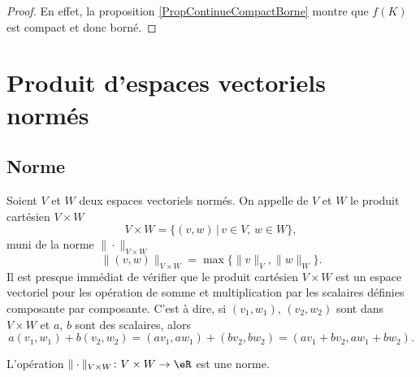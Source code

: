 \begin{proof}
	En effet, la proposition \ref{PropContinueCompactBorne} montre que $f(K)$ est compact et donc borné.
\end{proof}


\section{Produit d'espaces vectoriels normés}\label{sec_prod}

\subsection{Norme}

Soient $V$ et $W$ deux espaces vectoriels normés. On appelle  de $V$ et $W$ le produit cartésien $V\times W$ 
\begin{equation}
V\times W=\{(v,w)\,|\, v\in V,\, w\in W\},
\end{equation}
muni de la norme $\|\cdot \|_{V\times W}$
\begin{equation}	\label{EqNormeVxWmax}
	\|(v,w) \|_{V\times W}=\max\{\|v\|_{V},\|w\|_W\}.
\end{equation}
Il est presque immédiat de vérifier que le produit cartésien $V\times W$ est un espace vectoriel pour les opération de somme et multiplication par les scalaires définies composante par composante. C'est à dire,  si $(v_1,w_1)$, $(v_2,w_2)$ sont dans $V\times W$ et $a$, $b$ sont des scalaires, alors  
\begin{equation}
 a (v_1,w_1)+ b(v_2,w_2)=(av_1,aw_1)+ (bv_2,bw_2)=(av_1+bv_2,aw_1+bw_2).
\end{equation}

\begin{lemma}
	L'opération $\|\cdot \|_{V\times W}\colon V\times W\to \eR$ est une norme.
\end{lemma}

